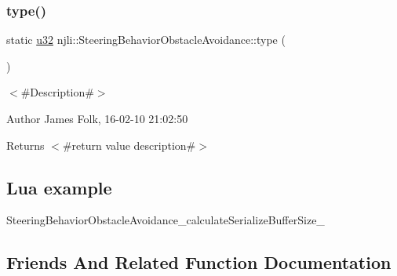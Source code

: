 \mbox{\label{classnjli_1_1_steering_behavior_obstacle_avoidance_ab5b0285af090b09dbc9e26105a4f7a31}} 
\subsubsection{\texorpdfstring{type()}{type()}}
{\footnotesize\ttfamily static \mbox{\hyperlink{_util_8h_a10e94b422ef0c20dcdec20d31a1f5049}{u32}} njli\+::\+Steering\+Behavior\+Obstacle\+Avoidance\+::type (\begin{DoxyParamCaption}{ }\end{DoxyParamCaption})\hspace{0.3cm}{\ttfamily [static]}}



$<$\#\+Description\#$>$ 

\begin{DoxyAuthor}{Author}
James Folk, 16-\/02-\/10 21\+:02\+:50
\end{DoxyAuthor}
\begin{DoxyReturn}{Returns}
$<$\#return value description\#$>$
\end{DoxyReturn}
\hypertarget{classnjli_1_1_steering_behavior_wander_ex1}{}\subsection{Lua example}\label{classnjli_1_1_steering_behavior_wander_ex1}

\begin{DoxyCodeInclude}
\end{DoxyCodeInclude}
Steering\+Behavior\+Obstacle\+Avoidance\+\_\+calculate\+Serialize\+Buffer\+Size\+\_\+ 

\subsection{Friends And Related Function Documentation}
\mbox{\label{classnjli_1_1_steering_behavior_obstacle_avoidance_acb96ebb09abe8f2a37a915a842babfac}} 
